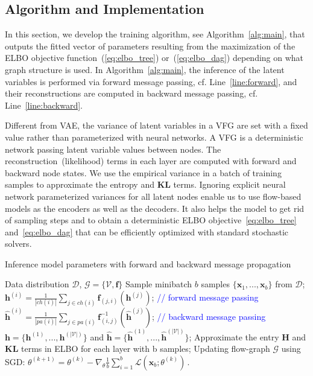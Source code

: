 \documentclass{article} %
\begin{document}
\vspace{-0.05in}
\subsection{Algorithm and Implementation}
\vspace{-0.05in}

In this section, we develop the training algorithm, see Algorithm~\ref{alg:main}, that outputs the fitted vector of parameters resulting from the maximization of the ELBO objective function~(\eqref{eq:elbo_tree}) or~(\eqref{eq:elbo_dag}) depending on what graph structure is used.
In Algorithm~\ref{alg:main}, the inference of the latent variables is performed via forward message passing, cf. Line~\ref{line:forward}, and their reconstructions are computed in backward message passing, cf. Line~\ref{line:backward}.

Different from VAE,  the variance of latent variables in a VFG are set with a fixed value rather than parameterized with neural networks. A VFG is a deterministic network passing latent variable values between nodes. The reconstruction~(likelihood) terms in each layer are computed with forward and backward node states. We use the empirical variance in a batch of training samples to approximate the entropy and \textbf{KL} terms. Ignoring  explicit neural network parameterized variances  for all latent nodes enable us to use flow-based models as the encoders as well as the decoders. It also helps the model to get rid of sampling steps and to obtain a deterministic ELBO objective~\eqref{eq:elbo_tree} and~\eqref{eq:elbo_dag} that can be efficiently optimized with standard stochastic solvers. 


\begin{algorithm}[H]
   \caption{Inference model parameters with  forward and backward message propagation}
   \label{alg:main}
\begin{algorithmic}[1]
    Data distribution $\mathcal{D}$,  $\mathcal{G} = \{\mathcal{V}, \mathbf{f}\}$
   \STATE  Sample minibatch $b$ samples $\{\mathbf{x}_1, ..., \mathbf{x}_b \}$ from $\mathcal{D}$;
   \STATE $\mathbf{h}^{(i)} = \frac{1}{|ch(i)|} \sum_{j \in ch(i) } \mathbf{f}_{(j,i)}(\mathbf{h}^{(j)})$; \label{line:forward} \textcolor{blue}{// forward message passing}
   \STATE $\widehat{\mathbf{h}}^{(i)} = \frac{1}{|pa(i)|} \sum_{j \in pa(i) } \mathbf{f}^{-1}_{ (i,j)}(\widehat{\mathbf{h}}^{(j)}) $;\label{line:backward}  \textcolor{blue}{// backward message passing}
   \ENDFOR
    \STATE  $\mathbf{h} =  \{\mathbf{h}^{(1)}, ...,  \mathbf{h}^{(|\mathcal{V}|)}  \}$ and $ \widehat{\mathbf{h}} =  \{\widehat{\mathbf{h}}^{(1)}, ...,  \widehat{\mathbf{h}}^{(|\mathcal{V}|)}  \}$;
    \STATE Approximate the entry $\mathbf{H}$ and $\mathbf{KL}$ terms in ELBO for each layer with b samples;
    \STATE Updating flow-graph $\mathcal{G}$ using SGD: $\theta^{(k+1)} = \theta^{(k)} -  \nabla_{\theta}\frac{1}{b} \sum_{i=1}^b  \mathcal{L}(\mathbf{x}_b; \theta^{(k)})   \, .$
   \ENDFOR
\end{algorithmic}
\end{algorithm}
\end{document}
